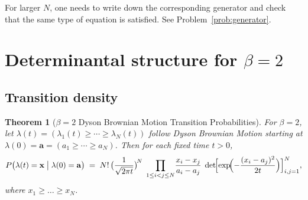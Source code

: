 \documentclass[letterpaper,11pt,oneside,reqno]{article}
\numberwithin{equation}{section}
\newtheorem{theorem}[proposition]{Theorem}
\theoremstyle{definition}
\begin{document}
For larger $N$, one needs to write down the corresponding generator and check
that the same type of equation is satisfied.
See Problem~\ref{prob:generator}.

\section{Determinantal structure for $\beta=2$}

\subsection{Transition density}



\begin{theorem}[\(\beta=2\) Dyson Brownian Motion Transition Probabilities]
For \(\beta=2\), let \(\lambda(t)=(\lambda_1(t)\ge \cdots \ge \lambda_N(t))\) follow Dyson Brownian Motion starting at \(\lambda(0)=\mathbf{a}=(a_1\ge \cdots \ge a_N)\).  Then for each fixed time \(t>0\),
\[
P\bigl(\lambda(t) = \mathbf{x}\;\big|\;\lambda(0)=\mathbf{a}\bigr)
\;=\;
N!\,\bigl(\frac{1}{\sqrt{2\pi t}}\bigr)^{\!N}
\;\prod_{1\le i<j\le N}\!\frac{x_i - x_j}{a_i - a_j}
\;\det\!\Bigl[\exp\!\Bigl(-\frac{(x_i - a_j)^2}{2t}\Bigr)\Bigr]_{i,j=1}^N,
\]
where \(x_1 \ge \dots \ge x_N\).
\end{theorem}
\end{document}

